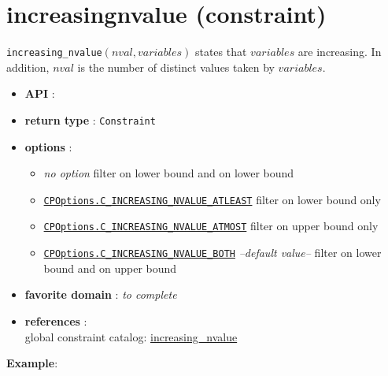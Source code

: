 \label{increasingnvalue}
\hypertarget{increasingnvalue}{}

\section{increasingnvalue (constraint)}\label{increasingnvalue:increasingnvalueconstraint}\hypertarget{increasingnvalue:increasingnvalueconstraint}{}
\begin{notedef}
  \texttt{increasing\_nvalue}$(nval, variables)$ states that $variables$ are increasing. In addition, $nval$ is the number of distinct values taken by $variables$.
\end{notedef}

\begin{itemize}
	\item \textbf{API} : 
	\item \textbf{return type} : \texttt{Constraint}
	\item \textbf{options} :
	\begin{itemize}
		\item \emph{no option} filter on lower bound and on lower bound
		\item \hyperlink{cinvatleast:cinvatleastoptions}{\tt CPOptions.C\_INCREASING\_NVALUE\_ATLEAST} filter on lower bound only
		\item \hyperlink{cinvatmost:cinvatmostoptions}{\tt CPOptions.C\_INCREASING\_NVALUE\_ATMOST} filter on upper bound only
		\item \hyperlink{cinvboth:cinvbothoptions}{\tt CPOptions.C\_INCREASING\_NVALUE\_BOTH} \textit{--default value--} filter on lower bound and on upper bound
	\end{itemize}
	\item \textbf{favorite domain} : \emph{to complete}
	\item \textbf{references} :\\
      global constraint catalog: \href{http://www.emn.fr/x-info/sdemasse/gccat/Cincreasing_nvalue.html}{increasing\_nvalue}
\end{itemize}

\textbf{Example}:
 

